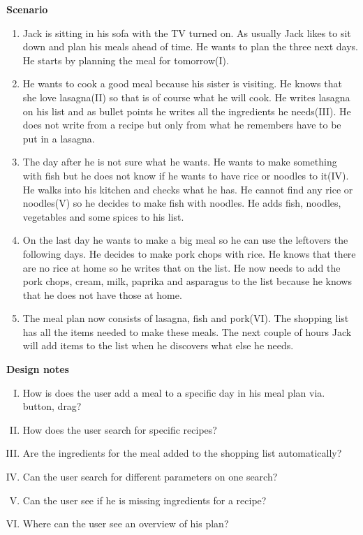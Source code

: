\textbf{Scenario}
\begin{enumerate}
\item Jack is sitting in his sofa with the TV turned on. As usually Jack likes to sit down and plan his meals ahead of time. He wants to plan the three next days. He starts by planning the meal for tomorrow(I).   
\item He wants to cook a good meal because his sister is visiting. He knows that she love lasagna(II) so that is of course what he will cook. He writes lasagna on his list and as bullet points he writes all the ingredients he needs(III). He does not write from a recipe but only from what he remembers have to be put in a lasagna.
\item The day after he is not sure what he wants. He wants to make something with fish but he does not know if he wants to have rice or noodles to it(IV). He walks into his kitchen and checks what he has. He cannot find any rice or noodles(V) so he decides to make fish with noodles. He adds fish, noodles, vegetables and some spices to his list.
\item On the last day he wants to make a big meal so he can use the leftovers the following days. He decides to make pork chops with rice. He knows that there are no rice at home so he writes that on the list. He now needs to add the pork chops, cream, milk, paprika and asparagus to the list because he knows that he does not have those at home. 
\item The meal plan now consists of lasagna, fish and pork(VI). The shopping list has all the items needed to make these meals. The next couple of hours Jack will add items to the list when he discovers what else he needs.   
\end{enumerate}

\textbf{Design notes}
\begin{enumerate} [(I)]
\item How is does the user add a meal to a specific day in his meal plan via. button, drag?
\item How does the user search for specific recipes?
\item Are the ingredients for the meal added to the shopping list automatically?
\item Can the user search for different parameters on one search?
\item Can the user see if he is missing ingredients for a recipe?
\item Where can the user see an overview of his plan?
\end{enumerate}

